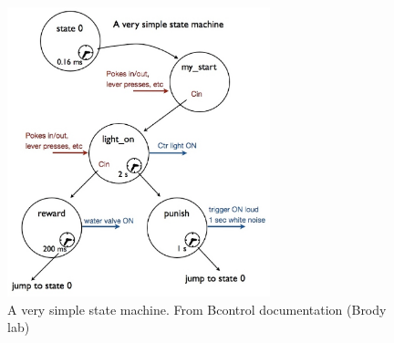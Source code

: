 \documentclass[a4paper]{report}
\begin{document}
\begin{figure}[h]
\center
\includegraphics[width=3in]{figure/SimplestFST.eps}
\caption{A very simple state machine. From Bcontrol documentation (Brody lab)}
\end{figure}
\end{document}
